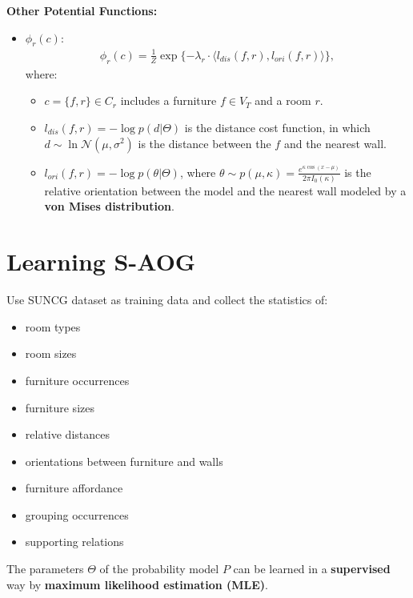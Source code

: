 \documentclass[10pt]{article}
\begin{document}
\textbf{Other Potential Functions:}
%
\begin{itemize}
  \item $\phi_r(c)$:
    \begin{align}
      \label{eq:10}
      \phi_r(c) = \frac{1}{Z} \exp\{-\lambda_r \cdot \langle l_{dis}(f, r), l_{ori}(f, r) \rangle\},
    \end{align}
    where:
    \begin{itemize}
      \item $c = \{f, r\} \in C_r$ includes a furniture $f \in V_T$ and a room
        $r$.
      \item $l_{dis}(f, r) = -\log p(d \vert \Theta)$ is the distance cost
        function, in which $d \sim \ln \mathcal{N}(\mu, \sigma^2)$ is the
        distance between the $f$ and the nearest wall.
      \item $l_{ori}(f, r) = -\log p(\theta \vert \Theta)$, where
        $\theta \sim p(\mu, \kappa) = \frac{e^{\kappa \cos (x - \mu)}}{2 \pi I_0(\kappa)} $
        is the relative orientation between the model and the nearest wall
        modeled by a \textbf{von Mises distribution}.
    \end{itemize}
\end{itemize}


\section{Learning S-AOG}%
\label{sec:learning}
Use SUNCG dataset as training data and collect the statistics of:
%
\begin{itemize}
  \item room types
  \item room sizes%
  \item furniture occurrences
  \item furniture sizes
  \item relative distances
  \item orientations between furniture and walls
  \item furniture affordance
  \item grouping occurrences
  \item supporting relations
\end{itemize}
%
The parameters $\Theta$ of the probability model $P$ can be learned in a
\textbf{supervised} way by \textbf{maximum likelihood estimation (MLE)}.
\end{document}
